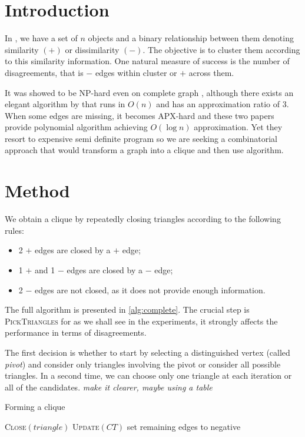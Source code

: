 \section{Introduction}

In \pcc{}, we have a set of $n$ objects and a binary
relationship between them denoting similarity $(+)$  or dissimilarity $(-)$.
The objective is to cluster them according to this similarity information. One
natural measure of success is the number of disagreements, that is $-$ edges
within cluster or $+$ across them.

It was showed to be NP-hard even on complete graph \autocite{Bansal2002},
although there exists an elegant algorithm by \textcite{Ailon2008} that runs
in $O(n)$ and has an approximation ratio of $3$. When some edges are missing, it
becomes APX-hard \autocites{Charikar2003}{Demaine2006} and these two papers
provide polynomial algorithm achieving $O(\log n)$ approximation. Yet they
resort to expensive semi definite program so we are seeking a combinatorial
approach that would transform a graph into a clique and then use
\textcite{Ailon2008} algorithm.

\section{Method}

We obtain a clique by repeatedly closing triangles according to the following
rules:

\begin{itemize}
	\item 2 $+$ edges are closed by a $+$ edge;
	\item 1 $+$ and 1 $-$ edges are closed by a $-$ edge;
	\item 2 $-$ edges are not closed, as it does not provide enough
		information.
\end{itemize}

The full algorithm is presented in \autoref{alg:complete}. The crucial step
is \textsc{PickTriangles} for as we shall see in the experiments, it strongly
affects the performance in terms of disagreements.

The first decision is whether to start by selecting a distinguished vertex
(called \emph{pivot}) and consider only triangles involving the pivot or
consider all possible triangles. In a second time, we can choose only one
triangle at each iteration or all of the candidates. \emph{make it clearer,
maybe using a table}

\begin{algorithm}
	\caption{Forming a clique \label{alg:complete}}
	\begin{algorithmic}[0]
				\State \textsc{Close}$(triangle)$
			\EndFor
			\State \textsc{Update}$(CT)$
		\EndWhile
		\State set remaining edges to negative
	\end{algorithmic}
\end{algorithm}

